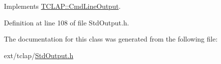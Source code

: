 Implements \hyperlink{class_t_c_l_a_p_1_1_cmd_line_output_ae052fea473132482296de55edb3dd480}{T\+C\+L\+A\+P\+::\+Cmd\+Line\+Output}.



Definition at line 108 of file Std\+Output.\+h.



The documentation for this class was generated from the following file\+:\begin{DoxyCompactItemize}
\item 
ext/tclap/\hyperlink{_std_output_8h}{Std\+Output.\+h}\end{DoxyCompactItemize}
